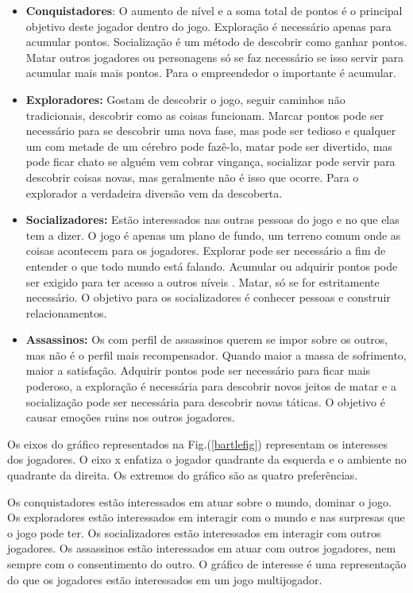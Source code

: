 \begin{itemize}
\item  \textbf {Conquistadores}: O aumento de nível e a soma total de pontos é o principal objetivo deste jogador dentro do jogo. Exploração é necessário apenas para acumular pontos. Socialização é um método de descobrir como ganhar pontos. Matar outros jogadores ou personagens só se faz necessário se isso servir para acumular mais mais pontos. Para o empreendedor o importante é acumular.
\item  \textbf {Exploradores:}  Gostam de descobrir o jogo, seguir caminhos não tradicionais, descobrir como as coisas funcionam. Marcar pontos pode ser necessário para se descobrir uma nova fase, mas pode ser tedioso e qualquer um com metade de um cérebro pode fazê-lo, matar pode ser divertido, mas pode ficar chato se alguém vem cobrar vingança, socializar pode servir para descobrir coisas novas, mas geralmente não é isso que ocorre. Para o explorador a verdadeira diversão vem da descoberta.
\item  \textbf {Socializadores: } Estão interessados nas outras pessoas do jogo e no que elas tem a dizer. O jogo é apenas um plano de fundo, um terreno comum onde as coisas acontecem para os jogadores. Explorar pode ser necessário a fim de entender o que todo mundo está falando. Acumular ou adquirir pontos pode ser exigido para ter acesso a outros níveis . Matar, só se for estritamente necessário. O objetivo para os socializadores é conhecer pessoas e construir relacionamentos.
\item  \textbf{Assassinos:} Os com perfil de assassinos querem se impor sobre os outros, mas não é o perfil mais recompensador. Quando maior a massa de sofrimento, maior a satisfação. Adquirir pontos pode ser necessário para ficar mais poderoso, a exploração é necessária para descobrir novos jeitos de matar e a socialização pode ser necessária para descobrir novas táticas. O objetivo é causar emoções ruins nos outros jogadores.
\end{itemize}

\newpage

Os eixos do gráfico representados na Fig.(\ref{bartlefig}) representam os interesses dos jogadores. O eixo x enfatiza o jogador quadrante da esquerda e o ambiente no quadrante da direita. Os extremos do gráfico são as quatro preferências. 

Os conquistadores estão interessados em atuar sobre o mundo, dominar o jogo. Os exploradores estão interessados em interagir com o mundo e nas surpresas que o jogo pode ter. Os socializadores estão interessados em interagir com outros jogadores. Os assassinos estão interessados em atuar com outros jogadores, nem sempre com o consentimento do outro. O gráfico de interesse é uma representação do que os jogadores estão interessados em um jogo multijogador.

